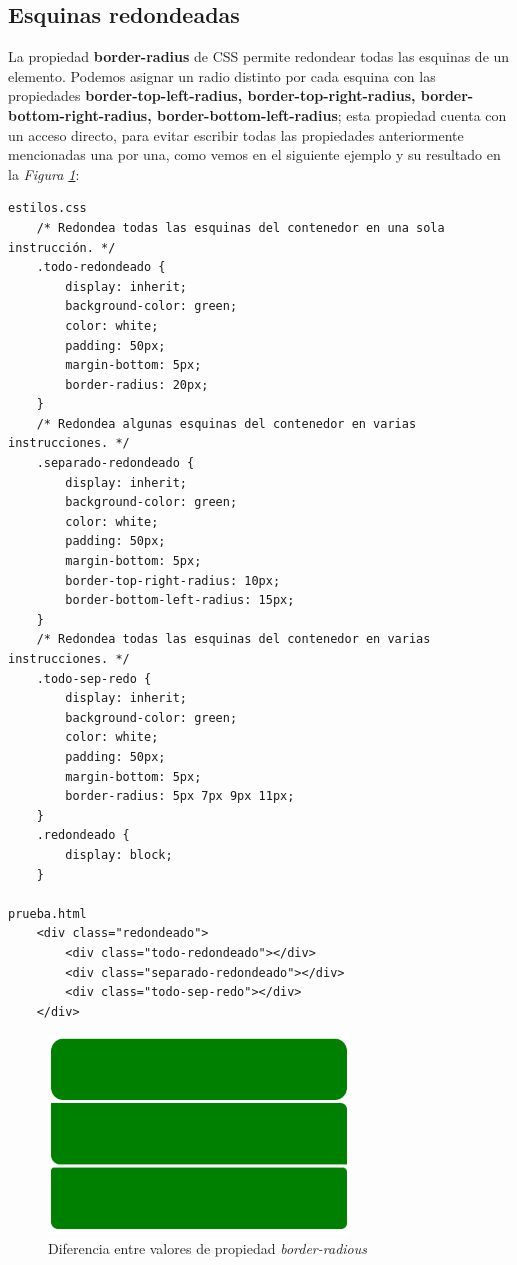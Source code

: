 \subsection{Esquinas redondeadas}

La propiedad \textbf{border-radius} de CSS permite redondear todas las esquinas de un elemento. Podemos asignar un radio distinto por cada esquina con las propiedades \textbf{border-top-left-radius, border-top-right-radius, border-bottom-right-radius, border-bottom-left-radius}; esta propiedad cuenta con un acceso directo, para evitar escribir todas las propiedades anteriormente mencionadas una por una, como vemos en el siguiente ejemplo y su resultado en la \textit{Figura \ref{fig: 33}}:
\begin{lstlisting}
estilos.css
    /* Redondea todas las esquinas del contenedor en una sola instrucción. */
    .todo-redondeado {
        display: inherit;
        background-color: green;
        color: white;
        padding: 50px;
        margin-bottom: 5px;
        border-radius: 20px;
    }
    /* Redondea algunas esquinas del contenedor en varias instrucciones. */
    .separado-redondeado {
        display: inherit;
        background-color: green;
        color: white;
        padding: 50px;
        margin-bottom: 5px;
        border-top-right-radius: 10px;
        border-bottom-left-radius: 15px;
    }
    /* Redondea todas las esquinas del contenedor en varias instrucciones. */
    .todo-sep-redo {
        display: inherit;
        background-color: green;
        color: white;
        padding: 50px;
        margin-bottom: 5px;
        border-radius: 5px 7px 9px 11px;
    }
    .redondeado {
        display: block;
    }

prueba.html
    <div class="redondeado">
        <div class="todo-redondeado"></div>
        <div class="separado-redondeado"></div>
        <div class="todo-sep-redo"></div>
    </div>
\end{lstlisting}
\begin{figure}[H]
    \centering
    \caption{Diferencia entre valores de propiedad \textit{border-radious}}
    \label{fig: 33}
    \includegraphics[width=8cm]{ss/border-radious.png}
\end{figure}

